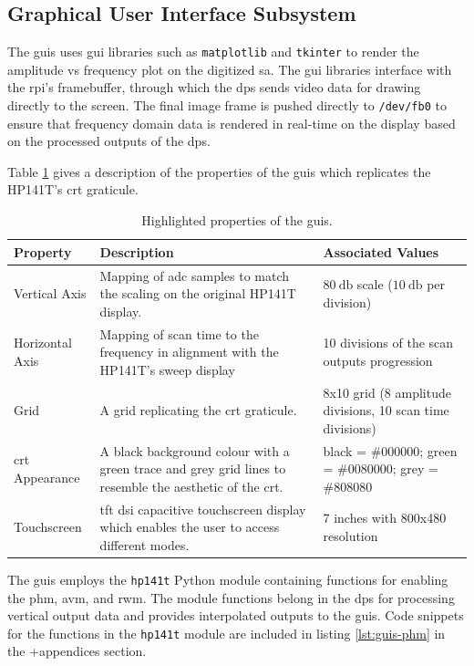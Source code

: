 \documentclass[class=report,11pt,crop=false]{standalone}
\begin{document}
	\subsection{Graphical User Interface Subsystem}
	
	The \acrshort{guis} uses \acrshort{gui} libraries such as \texttt{matplotlib} and \texttt{tkinter} to render the amplitude vs frequency plot on the digitized \acrshort{sa}. The \acrshort{gui} libraries interface with the \acrshort{rpi}'s framebuffer, through which the \acrshort{dps} sends video data for drawing directly to the screen. The final image frame is pushed directly to \texttt{/dev/fb0} to ensure that frequency domain data is rendered in real-time on the display based on the processed outputs of the \acrshort{dps}.
	
	Table \ref{tab:guis-properties} gives a description of the properties of the \acrshort{guis} which replicates the HP141T's \acrshort{crt} graticule. 
	\begin{table}[ht!]
		\centering
		\label{tab:guis-properties}
		\begin{tabular}{|m{5em}|m{15em}|m{10em}|}
			\hline
			\rowcolor{cyan!25} \textbf{Property}	& \textbf{Description}	& \textbf{Associated Values}\\
			\hline
			Vertical Axis	& Mapping of \acrshort{adc} samples to match the scaling on the original HP141T display.	&  $\SI{80}{\decibel}$ scale ($\SI{10}{\decibel}$ per division)\\
			\hline
			Horizontal Axis & Mapping of scan time to the frequency in alignment with the HP141T's sweep display & 10 divisions of the scan outputs progression\\
			\hline
			Grid	& A grid replicating the \acrshort{crt} graticule. & 8x10 grid (8 amplitude divisions, 10 scan time divisions)\\
			\hline
			\acrshort{crt} Appearance & A black background colour with a green trace and grey grid lines to resemble the aesthetic of the \acrshort{crt}. & black = $\#000000$; green = $\#0080000$; grey = $\#808080$\\
			\hline
			Touchscreen	& \acrshort{tft} \acrshort{dsi} capacitive touchscreen display which enables the user to access different modes. & 7 inches with 800x480 resolution\\
			\hline
		\end{tabular}
		\caption{Highlighted properties of the \acrshort{guis}.}
	\end{table}
	
	The \acrshort{guis} employs the \texttt{hp141t} Python module containing functions for enabling the \acrshort{phm}, \acrshort{avm}, and \acrshort{rwm}. The module functions belong in the \acrshort{dps} for processing vertical output data and provides interpolated outputs to the \acrshort{guis}. Code snippets for the functions in the \texttt{hp141t} module are included in listing \ref{lst:guis-phm} in the +appendices section.
		
\end{document}
